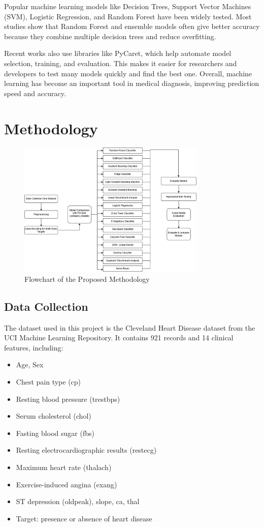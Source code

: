\documentclass[journal]{IEEEtran}
\begin{document}
Popular machine learning models like Decision Trees, Support Vector Machines (SVM), Logistic Regression, and Random Forest have been widely tested. Most studies show that Random Forest and ensemble models often give better accuracy because they combine multiple decision trees and reduce overfitting.

Recent works also use libraries like PyCaret, which help automate model selection, training, and evaluation. This makes it easier for researchers and developers to test many models quickly and find the best one. Overall, machine learning has become an important tool in medical diagnosis, improving prediction speed and accuracy.


\section{Methodology}
\begin{figure}[t]
\centering
\includegraphics[width=0.8\textwidth]{images/Methodology Diagram.png}
\caption{Flowchart of the Proposed Methodology}
\label{fig:methodology}
\end{figure}

\subsection{Data Collection}
The dataset used in this project is the Cleveland Heart Disease dataset from the UCI Machine Learning Repository. It contains 921 records and 14 clinical features, including:
\begin{itemize}
    \item Age, Sex
    \item Chest pain type (cp)
    \item Resting blood pressure (trestbps)
    \item Serum cholesterol (chol)
    \item Fasting blood sugar (fbs)
    \item Resting electrocardiographic results (restecg)
    \item Maximum heart rate (thalach)
    \item Exercise-induced angina (exang)
    \item ST depression (oldpeak), slope, ca, thal
    \item Target: presence or absence of heart disease
\end{itemize}
\end{document}
